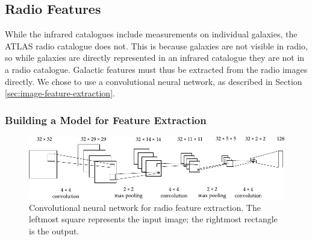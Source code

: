 

  \subsection{Radio Features}
  \label{sec:radio-features}

    While the infrared catalogues include measurements on individual galaxies,
    the ATLAS radio catalogue does not. This is because galaxies are not
    visible in radio, so while galaxies are directly represented in an infrared
    catalogue they are not in a radio catalogue. Galactic features must thus be
    extracted from the radio images directly. We chose to use a convolutional
    neural network, as described in Section \ref{sec:image-feature-extraction}.


    \subsubsection{Building a Model for Feature Extraction}
    \label{sec:feature-extraction-model}

      \begin{figure}[!ht]
         \centering
         \includegraphics[width=\textwidth]{images/cnn_new.pdf}
         \caption{Convolutional neural network for radio feature extraction. The
           leftmost square represents the input image; the rightmost rectangle
           is the output.}
         \label{fig:radio-cnn}
       \end{figure}

